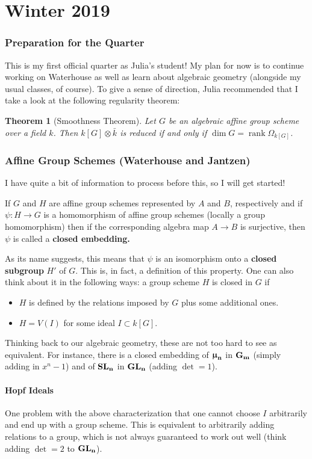 \documentclass[12pt]{article}
\theoremstyle{nonumberbreak}
\theoremstyle{changebreak}
\newtheorem{thm}{Theorem}[subsection]
\theoremstyle{nonumberplain}
\theoremstyle{change}
\let\oldpart\part%
\renewcommand{\part}{\clearpage\oldpart}%
\DeclareMathOperator{\rank}{rank}
\DeclareMathOperator{\Gm}{\ensuremath\mathbf{G_m}}
\newcommand*{\GL}[1]{\ensuremath\mathbf{GL_#1}}
\newcommand*{\SL}[1]{\ensuremath\mathbf{SL_#1}}
\newcommand*{\mun}[1]{\ensuremath\mathbf{\bm\upmu_#1}}
\begin{document}
\part{Winter 2019}
\section{Preparation for the Quarter}
This is my first official quarter as Julia's student! My plan for now is to continue working on Waterhouse as well
as learn about algebraic geometry (alongside my usual classes, of course).
To give a sense of direction, Julia recommended that I take a look at the following regularity theorem:
\begin{thm}[Smoothness Theorem]\label{smooth}
	Let $G$ be an algebraic affine group scheme over a field $k$. Then $k[G]\otimes \bar k$ is reduced if and
	only if $\dim G = \rank \Omega_{k[G]}$.
\end{thm}
\section{Affine Group Schemes (Waterhouse and Jantzen)	}
I have quite a bit of information to process before this, so I will get started!
\begin{defn}
	If $G$ and $H$ are affine group schemes represented by $A$ and $B$, respectively and
	if $\psi:H\to G$ is a homomorphism of affine group schemes (locally a group homomorphism)
	then if the corresponding algebra map $A\to B$ is surjective, then $\psi$ is called
	a \textbf{closed embedding.}
\end{defn}

As its name suggests, this means that $\psi$ is an isomorphism onto a \textbf{closed subgroup}
$H'$ of $G$. This is, in fact, a definition of this property. One can also think about 
it in the following ways: a group scheme $H$ is closed in $G$ if
\begin{itemize}
	\item $H$ is defined by the relations imposed by $G$ plus some additional ones.
	\item $H=V(I)$ for some ideal $I\subset k[G]$. 
\end{itemize}
Thinking back to our algebraic geometry, these are not too hard to see as equivalent. 
For instance, there is a closed embedding of $\mun n$ in $\Gm$ (simply adding in $x^n-1$)
and of $\SL{n}$ in $\GL{n}$ (adding $\det = 1$).

\subsection{Hopf Ideals}
One problem with the above characterization that one cannot choose $I$ arbitrarily and end
up with a group scheme. This is equivalent to arbitrarily adding relations to a group, which is
not always guaranteed to work out well (think adding $\det = 2$ to $\GL n$).
\end{document}
